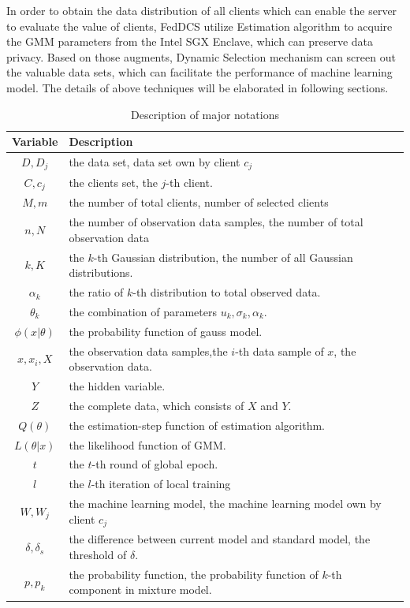 \documentclass[conference]{IEEEtran}
\begin{document}
In order to obtain the data distribution of all clients which can enable the
server to evaluate the value of clients, FedDCS utilize Estimation algorithm 
to acquire the GMM parameters from the Intel SGX Enclave, which can preserve 
data privacy. Based on those augments, Dynamic Selection mechanism can screen
out the valuable data sets, which can facilitate the performance of machine
learning model. The details of above techniques will be elaborated in following sections. 
\begin{table}
\caption{Description of major notations}\label{tab2}
\begin{tabular}{c|m{6cm}}
\hline
Variable    & Description \\ \hline
$D,D_j$     & the data set, data set own by client $c_j$ \\ \hline
$C,c_j$     & the clients set, the $j$-th client. \\ \hline
$M,m$       &the number of total clients, number of selected clients \\ \hline
$n, N$      & the number of observation data samples, the number of total observation data \\ \hline
$k,K$       & the $k$-th Gaussian distribution, the number of all Gaussian distributions.  \\ \hline
$\alpha_k$ &the ratio of $k$-th distribution to total observed data.  \\ \hline
$\theta_k$ &the combination of parameters $u_k,\sigma_k , \alpha_k$.\\ \hline
$\phi (x|\theta)$ &the probability function of gauss model.\\ \hline
$x,x_i,X$ &the observation data samples,the $i$-th data sample of $x$, the observation data. \\ \hline
$Y$ &the hidden variable. \\ \hline
$Z$ &the complete data, which consists of $X$ and $Y$. \\ \hline
$Q(\theta)$ &the estimation-step function of estimation algorithm.\\ \hline
$L(\theta|x)$ &the likelihood function of GMM. \\ \hline
$t$ &the $t$-th round of global epoch. \\ \hline
$l$ &the $l$-th iteration of local training \\ \hline
$W,W_j$ &the machine learning model, the machine learning model own by client $c_j$ \\ \hline
$\delta, \delta_s$  &the difference between current model and standard model, the threshold of $\delta$. \\ \hline
$p,p_k$   & the probability function, the probability function of $k$-th component in mixture model. \\ \hline
\end{tabular}
\end{table}
\end{document}
